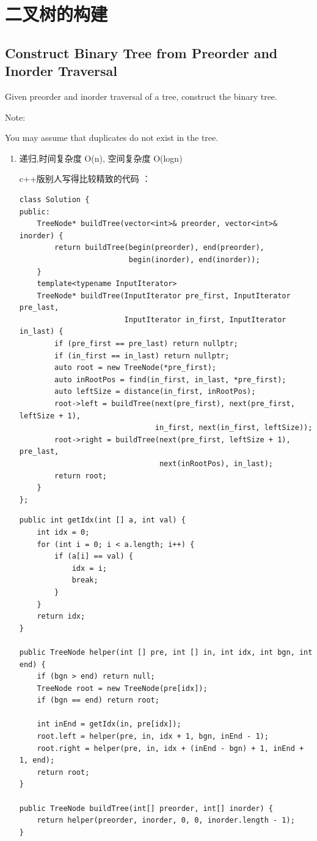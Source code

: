 \documentclass[12pt]{book}
\begin{document}
\section{二叉树的构建}
\label{sec-4-3}
\subsection{Construct Binary Tree from Preorder and Inorder Traversal}
\label{sec-4-3-1}
Given preorder and inorder traversal of a tree, construct the binary tree.

Note:

You may assume that duplicates do not exist in the tree.

\begin{enumerate}
\item 递归,时间复杂度 O(n), 空间复杂度 O(logn)
\label{sec-4-3-1-1}

c++版别人写得比较精致的代码 ： 

\lstset{language=java,label= ,caption= ,numbers=none}
\begin{lstlisting}
class Solution {
public:
    TreeNode* buildTree(vector<int>& preorder, vector<int>& inorder) {
        return buildTree(begin(preorder), end(preorder),
                         begin(inorder), end(inorder));
    }
    template<typename InputIterator>
    TreeNode* buildTree(InputIterator pre_first, InputIterator pre_last,
                        InputIterator in_first, InputIterator in_last) {
        if (pre_first == pre_last) return nullptr;
        if (in_first == in_last) return nullptr;
        auto root = new TreeNode(*pre_first);
        auto inRootPos = find(in_first, in_last, *pre_first);
        auto leftSize = distance(in_first, inRootPos);
        root->left = buildTree(next(pre_first), next(pre_first, leftSize + 1),
                               in_first, next(in_first, leftSize));
        root->right = buildTree(next(pre_first, leftSize + 1), pre_last,
                                next(inRootPos), in_last);
        return root;
    }
};
\end{lstlisting}

\lstset{language=java,label= ,caption= ,numbers=none}
\begin{lstlisting}
public int getIdx(int [] a, int val) {
    int idx = 0;
    for (int i = 0; i < a.length; i++) {
        if (a[i] == val) {
            idx = i;
            break;
        }
    }
    return idx;
}
        
public TreeNode helper(int [] pre, int [] in, int idx, int bgn, int end) {
    if (bgn > end) return null;
    TreeNode root = new TreeNode(pre[idx]);
    if (bgn == end) return root;

    int inEnd = getIdx(in, pre[idx]);
    root.left = helper(pre, in, idx + 1, bgn, inEnd - 1);
    root.right = helper(pre, in, idx + (inEnd - bgn) + 1, inEnd + 1, end);
    return root;
}

public TreeNode buildTree(int[] preorder, int[] inorder) {
    return helper(preorder, inorder, 0, 0, inorder.length - 1);
}
\end{lstlisting}
\end{enumerate}
\end{document}
